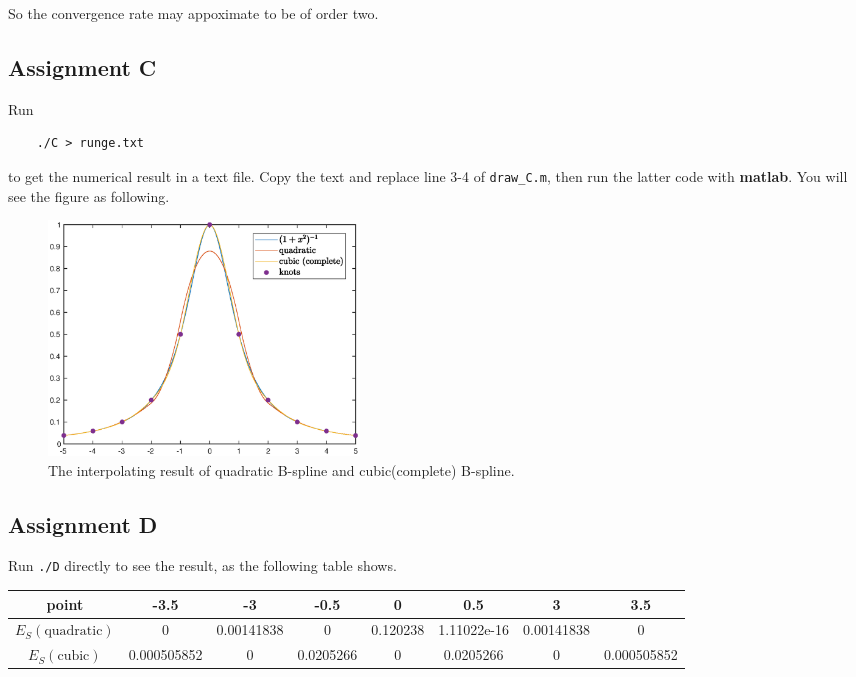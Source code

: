 \documentclass[11pt,en]{elegantpaper}
\begin{document}
So the convergence rate may appoximate to be of order two.

\subsection{Assignment C}

Run

\begin{lstlisting}
    ./C > runge.txt
\end{lstlisting}

to get the numerical result in a text file. Copy the text and replace line 3-4 of \verb|draw_C.m|, then run the latter code with \textbf{matlab}. You will see the figure as following.

\begin{figure}[htbp]
    \centering
    \includegraphics[width=0.4\textwidth]{figure/assC.eps}
    \caption{The interpolating result of quadratic B-spline and cubic(complete) B-spline.}
\end{figure}

\subsection{Assignment D}

Run \verb|./D| directly to see the result, as the following table shows.

\begin{table}[htbp]
    \centering
    \begin{tabular}{c|ccccccc}
    \textbf{point}            & -3.5        & -3         & -0.5      & 0        & 0.5         & 3          & 3.5         \\ \hline
    $E_{S}(\text{quadratic})$ & 0           & 0.00141838 & 0         & 0.120238 & 1.11022e-16 & 0.00141838 & 0           \\
    $E_{S}(\text{cubic})$     & 0.000505852 & 0          & 0.0205266 & 0        & 0.0205266   & 0          & 0.000505852
    \end{tabular}
\end{table}
\end{document}

